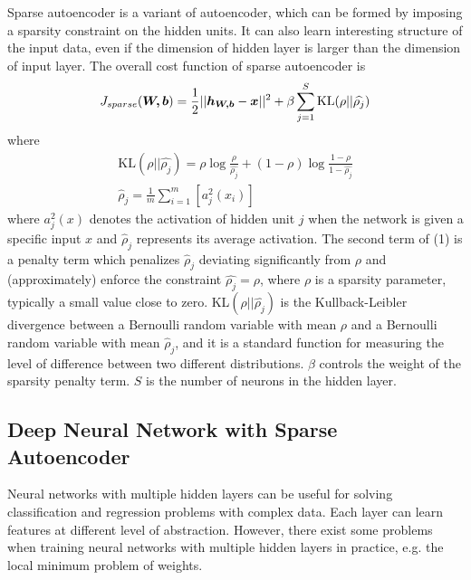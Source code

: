 \documentclass[runningheads]{article}
\begin{document}
Sparse autoencoder \cite{sae2011sparse,SAE2009_3790} is a variant of autoencoder, which can be formed by imposing a sparsity constraint on the hidden units. It can also learn interesting structure of the input data, even if the dimension of hidden layer is larger than the dimension of input layer. The overall cost function of sparse autoencoder is
\begin{equation}
	J_{sparse}(\bm{W,b}) = \frac{1}{2}||\bm{h_{W,b}}-\bm{x}||^{2} + \beta \sum_{j=1}^{S}\text{KL}(\rho||\widehat{\rho_j})\\
\end{equation}
where
\begin{gather}
\text{KL}(\rho||\widehat{\rho_j}) = \rho \log \frac{\rho}{\widehat{\rho_j}} + (1-\rho)\log \frac{1-\rho}{1-\widehat{\rho_j}}\\
\widehat\rho_j = \frac{1}{m} \sum_{i=1}^{m}[a_j^2(x_i)]
\end{gather}
where \emph{$a_j^2(x)$} denotes the activation of hidden unit \emph{$j$} when the network is given a specific input \emph{$x$} and \emph{$\widehat\rho_j$} represents its average activation. The second term of (1) is a penalty term which penalizes \emph{$\widehat\rho_j$} deviating significantly from \emph{$\rho$} and (approximately) enforce the constraint \emph{$\widehat{\rho_j} = \rho$}, where \emph{$\rho$} is a sparsity parameter, typically a small value close to zero. KL\emph{$(\rho||\widehat{\rho_j})$} is the Kullback-Leibler divergence \cite{kl1951information} between a Bernoulli random variable with mean \emph{$\rho$} and a Bernoulli random variable with mean \emph{$\widehat\rho_j$}, and it is a standard function for measuring the level of difference between two different distributions. \emph{$\beta$} controls the weight of the sparsity penalty term. \emph{$S$} is the number of neurons in the hidden layer.


\subsection{Deep Neural Network with Sparse Autoencoder}
Neural networks with multiple hidden layers can be useful for solving classification and regression problems with complex data. Each layer can learn features at different level of abstraction. However, there exist some problems when training neural networks with multiple hidden layers in practice, e.g. the local minimum problem of weights.
\end{document}
